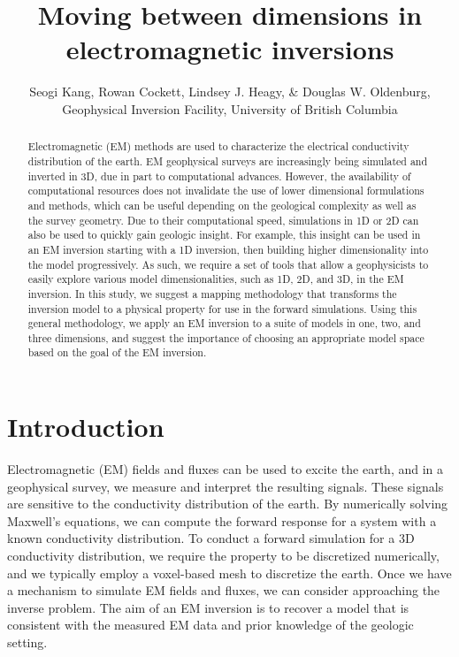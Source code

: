 \documentclass{segabs}
\begin{document}
\title{Moving between dimensions in electromagnetic inversions}

\renewcommand{\thefootnote}{\fnsymbol{footnote}}

\author{Seogi Kang\footnotemark[1], Rowan Cockett, Lindsey J. Heagy, \& Douglas W. Oldenburg, Geophysical Inversion Facility, University of British Columbia}


\maketitle
\begin{abstract}
Electromagnetic (EM) methods are used to characterize the electrical conductivity distribution of the earth. EM geophysical surveys are increasingly being simulated and inverted in 3D, due in part to computational advances. However, the availability of computational resources does not invalidate the use of lower dimensional formulations and methods, which can be useful depending on the geological complexity as well as the survey geometry. Due to their computational speed, simulations in 1D or 2D can also be used to quickly gain geologic insight. For example, this insight can be used in an EM inversion starting with a 1D inversion, then building higher dimensionality into the model progressively. As such, we require a set of tools that allow a geophysicists to easily explore various model dimensionalities, such as 1D, 2D, and 3D, in the EM inversion. In this study, we suggest a mapping methodology that transforms the inversion model to a physical property for use in the forward simulations. Using this general methodology, we apply an EM inversion to a suite of models in one, two, and three dimensions, and suggest the importance of choosing an appropriate model space based on the goal of the EM inversion.
\end{abstract}
\renewcommand{\figdir}{Fig} %

\section{Introduction}
Electromagnetic (EM) fields and fluxes can be used to excite the earth, and in a geophysical survey, we measure and interpret the resulting signals. These signals are sensitive to the conductivity distribution of the earth. By numerically solving Maxwell's equations, we can compute the forward response for a system with a known conductivity distribution. To conduct a forward simulation for a 3D conductivity distribution, we require the property to be discretized numerically, and we typically employ a voxel-based mesh to discretize the earth. Once we have a mechanism to simulate EM fields and fluxes, we can consider approaching the inverse problem. The aim of an EM inversion is to recover a model that is consistent with the measured EM data and prior knowledge of the geologic setting.
\end{document}
